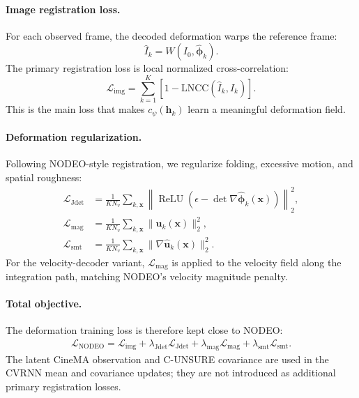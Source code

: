 \documentclass[10pt,twocolumn]{article}
\begin{document}
\paragraph{Image registration loss.}
For each observed frame, the decoded deformation warps the reference frame:
\begin{equation}
    \widehat I_k = W(I_0,\widehat{\bm{\phi}}_k).
\end{equation}
The primary registration loss is local normalized cross-correlation:
\begin{equation}
    \mathcal{L}_{\mathrm{img}}
    =
    \sum_{k=1}^{K}
    \left[
    1-\mathrm{LNCC}(\widehat I_k,I_k)
    \right].
    \label{eq:l_img}
\end{equation}
This is the main loss that makes $c_\psi(\bm{h}_k)$ learn a meaningful deformation field.

\paragraph{Deformation regularization.}
Following NODEO-style registration, we regularize folding, excessive motion, and spatial roughness:
\begin{align}
    \mathcal{L}_{\mathrm{Jdet}}
    &=
    \frac{1}{K N_v}
    \sum_{k,\bm{x}}
    \left\|
    \operatorname{ReLU}(\epsilon-\det\nabla\widehat{\bm{\phi}}_k(\bm{x}))
    \right\|_2^2,
    \label{eq:l_jdet}\\
    \mathcal{L}_{\mathrm{mag}}
    &=
    \frac{1}{K N_v}
    \sum_{k,\bm{x}}
    \|\widehat{\bm{u}}_k(\bm{x})\|_2^2,
    \label{eq:l_mag}\\
    \mathcal{L}_{\mathrm{smt}}
    &=
    \frac{1}{K N_v}
    \sum_{k,\bm{x}}
    \|\nabla\widehat{\bm{u}}_k(\bm{x})\|_2^2.
    \label{eq:l_smt}
\end{align}
For the velocity-decoder variant, $\mathcal{L}_{\mathrm{mag}}$ is applied to the velocity field along the integration path, matching NODEO's velocity magnitude penalty.

\paragraph{Total objective.}
The deformation training loss is therefore kept close to NODEO:
\begin{align}
    \mathcal{L}_{\mathrm{NODEO}}
    =
    \mathcal{L}_{\mathrm{img}}
    +\lambda_{\mathrm{Jdet}}\mathcal{L}_{\mathrm{Jdet}}
    +\lambda_{\mathrm{mag}}\mathcal{L}_{\mathrm{mag}}
    +\lambda_{\mathrm{smt}}\mathcal{L}_{\mathrm{smt}}.
    \label{eq:l_total}
\end{align}
The latent CineMA observation and C-UNSURE covariance are used in the CVRNN mean and covariance updates; they are not introduced as additional primary registration losses.
\end{document}

